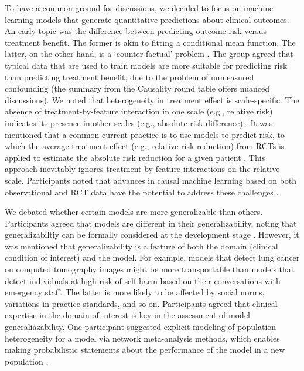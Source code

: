 To have a common ground for discussions, we decided to focus on machine learning  models that generate quantitative predictions about clinical outcomes. An early topic was the difference between predicting outcome risk versus treatment benefit. The former is akin to fitting a conditional mean function. The latter, on the other hand, is a `counter-factual' problem \citep{prosperi2020causal}. The group agreed that typical data that are used to train models are more suitable for predicting risk than predicting treatment benefit, due to the problem of unmeasured confounding (the summary from the Causality round table offers nuanced discussions). We noted that heterogeneity in treatment effect is scale-specific. The absence of treatment-by-feature interaction in one scale (e.g., relative risk) indicates its presence in other scales (e.g., absolute risk difference) \citep{greenland2009interactions}. It was mentioned that a common current practice is to use models to predict risk, to which the average treatment effect (e.g., relative risk reduction) from RCTs is applied to estimate the absolute risk reduction for a given patient \citep{Kent2020}. This approach inevitably ignores treatment-by-feature interactions on the relative scale. Participants noted that advances in causal machine learning based on both observational and RCT data have the potential to address these challenges \citep{feuerriegel2024causal}.

We debated whether certain models are more generalizable than others. Participants agreed that models are different in their generalizability, noting that generalizabiltiy can be formally considered at the development stage \citep{subbaswamy2019preventingfailuresdatasetshift}. However, it was mentioned that generalizability is a feature of both the domain (clinical condition of interest) and the model. For example, models that detect lung cancer on computed tomography images might be more transportable than models that detect individuals at high risk of self-harm based on their conversations with emergency staff. The latter is more likely to be affected by social norms, variations in practice standards, and so on. Participants agreed that clinical expertise in the domain of interest is key in the assessment of model generaliazability. One participant suggested explicit modeling of population heterogeneity for a model via network meta-analysis methods, which enables making probabilistic statements about the performance of the model in a new population \citep{Phillippo2020NMA}.

